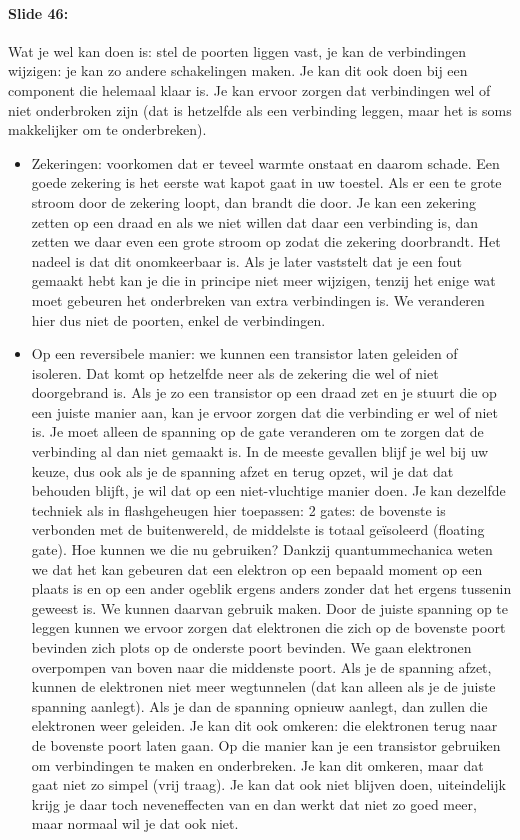 \documentclass[10pt,a4paper]{book}
\begin{document}
\paragraph{Slide 46:} Wat je wel kan doen is: stel de poorten liggen vast, je kan de verbindingen wijzigen: je kan zo andere schakelingen maken. Je kan dit ook doen bij een component die helemaal klaar is. Je kan ervoor zorgen dat verbindingen wel of niet onderbroken zijn (dat is hetzelfde als een verbinding leggen, maar het is soms makkelijker om te onderbreken).
\begin{itemize}
\item Zekeringen: voorkomen dat er teveel warmte onstaat en daarom schade. Een goede zekering is het eerste wat kapot gaat in uw toestel. Als er een te grote stroom door de zekering loopt, dan brandt die door. Je kan een zekering zetten op een draad en als we niet willen dat daar een verbinding is, dan zetten we daar even een grote stroom op zodat die zekering doorbrandt. Het nadeel is dat dit onomkeerbaar is. Als je later vaststelt dat je een fout gemaakt hebt kan je die in principe niet meer wijzigen, tenzij het enige wat moet gebeuren het onderbreken van extra verbindingen is. We veranderen hier dus niet de poorten, enkel de verbindingen.
\item Op een reversibele manier: we kunnen een transistor laten geleiden of isoleren. Dat komt op hetzelfde neer als de zekering die wel of niet doorgebrand is. Als je zo een transistor op een draad zet en je stuurt die op een juiste manier aan, kan je ervoor zorgen dat die verbinding er wel of niet is. Je moet alleen de spanning op de gate veranderen om te zorgen dat de verbinding al dan niet gemaakt is. In de meeste gevallen blijf je wel bij uw keuze, dus ook als je de spanning afzet en terug opzet, wil je dat dat behouden blijft, je wil dat op een niet-vluchtige manier doen. Je kan dezelfde techniek als in flashgeheugen hier toepassen: 2 gates: de bovenste is verbonden met de buitenwereld, de middelste is totaal ge\"isoleerd (floating gate). Hoe kunnen we die nu gebruiken? Dankzij quantummechanica weten we dat het kan gebeuren dat een elektron op een bepaald moment op een plaats is en op een ander ogeblik ergens anders zonder dat het ergens tussenin geweest is. We kunnen daarvan gebruik maken. Door de juiste spanning op te leggen kunnen we ervoor zorgen dat elektronen die zich op de bovenste poort bevinden zich plots op de onderste poort bevinden. We gaan elektronen overpompen van boven naar die middenste poort. Als je de spanning afzet, kunnen de elektronen niet meer wegtunnelen (dat kan alleen als je de juiste spanning aanlegt). Als je dan de spanning opnieuw aanlegt, dan zullen die elektronen weer geleiden. Je kan dit ook omkeren: die elektronen terug naar de bovenste poort laten gaan. Op die manier kan je een transistor gebruiken om verbindingen te maken en onderbreken. Je kan dit omkeren, maar dat gaat niet zo simpel (vrij traag). Je kan dat ook niet blijven doen, uiteindelijk krijg je daar toch neveneffecten van en dan werkt dat niet zo goed meer, maar normaal wil je dat ook niet. 

\end{itemize}
\end{document}
